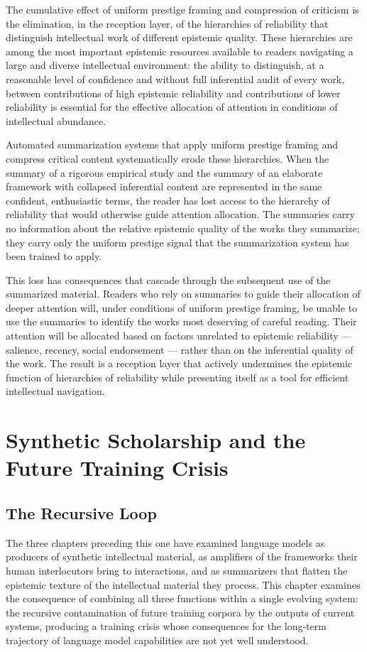 \documentclass[12pt, openright, twoside]{book}
\begin{document}
The cumulative effect of uniform prestige framing
and compression of criticism is the elimination,
in the reception layer, of the hierarchies of
reliability that distinguish intellectual work
of different epistemic quality. These hierarchies
are among the most important epistemic resources
available to readers navigating a large and
diverse intellectual environment: the ability
to distinguish, at a reasonable level of
confidence and without full inferential audit
of every work, between contributions of high
epistemic reliability and contributions of
lower reliability is essential for the effective
allocation of attention in conditions of
intellectual abundance.

Automated summarization systems that apply
uniform prestige framing and compress critical
content systematically erode these hierarchies.
When the summary of a rigorous empirical study
and the summary of an elaborate framework with
collapsed inferential content are represented
in the same confident, enthusiastic terms,
the reader has lost access to the hierarchy
of reliability that would otherwise guide
attention allocation. The summaries carry
no information about the relative epistemic
quality of the works they summarize; they
carry only the uniform prestige signal that
the summarization system has been trained
to apply.

This loss has consequences that cascade through
the subsequent use of the summarized material.
Readers who rely on summaries to guide their
allocation of deeper attention will, under
conditions of uniform prestige framing, be
unable to use the summaries to identify
the works most deserving of careful reading.
Their attention will be allocated based on
factors unrelated to epistemic reliability
--- salience, recency, social endorsement
--- rather than on the inferential quality
of the work. The result is a reception layer
that actively undermines the epistemic function
of hierarchies of reliability while presenting
itself as a tool for efficient intellectual
navigation.

\chapter{Synthetic Scholarship and the Future Training Crisis}

\section{The Recursive Loop}

The three chapters preceding this one have examined
language models as producers of synthetic intellectual
material, as amplifiers of the frameworks their human
interlocutors bring to interactions, and as summarizers
that flatten the epistemic texture of the intellectual
material they process. This chapter examines the
consequence of combining all three functions within
a single evolving system: the recursive contamination
of future training corpora by the outputs of current
systems, producing a training crisis whose consequences
for the long-term trajectory of language model
capabilities are not yet well understood.
\end{document}
